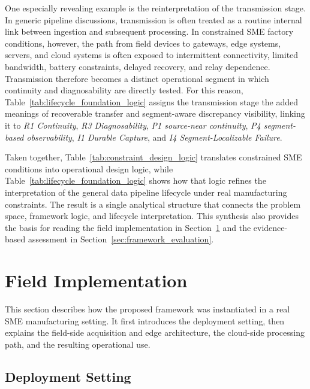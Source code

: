 \documentclass[systems,article,submit,pdftex,moreauthors]{Definitions/mdpi}
\begin{document}
One especially revealing example is the reinterpretation of the transmission stage. In generic pipeline discussions, transmission is often treated as a routine internal link between ingestion and subsequent processing. In constrained SME factory conditions, however, the path from field devices to gateways, edge systems, servers, and cloud systems is often exposed to intermittent connectivity, limited bandwidth, battery constraints, delayed recovery, and relay dependence. Transmission therefore becomes a distinct operational segment in which continuity and diagnosability are directly tested. For this reason, Table~\ref{tab:lifecycle_foundation_logic} assigns the transmission stage the added meanings of recoverable transfer and segment-aware discrepancy visibility, linking it to \emph{R1 Continuity}, \emph{R3 Diagnosability}, \emph{P1 source-near continuity}, \emph{P4 segment-based observability}, \emph{I1 Durable Capture}, and \emph{I4 Segment-Localizable Failure}.

Taken together, Table~\ref{tab:constraint_design_logic} translates constrained SME conditions into operational design logic, while Table~\ref{tab:lifecycle_foundation_logic} shows how that logic refines the interpretation of the general data pipeline lifecycle under real manufacturing constraints. The result is a single analytical structure that connects the problem space, framework logic, and lifecycle interpretation. This synthesis also provides the basis for reading the field implementation in Section~\ref{sec:field_implementation} and the evidence-based assessment in Section~\ref{sec:framework_evaluation}.

\section{Field Implementation}
\label{sec:field_implementation}

This section describes how the proposed framework was instantiated in a real SME manufacturing setting. It first introduces the deployment setting, then explains the field-side acquisition and edge architecture, the cloud-side processing path, and the resulting operational use.

\subsection{Deployment Setting}
\label{sec:deployment_setting}
\end{document}
